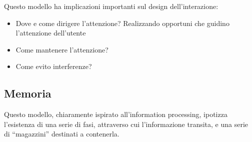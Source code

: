 \begin{center}
{
    }
\end{center}

Questo modello ha implicazioni importanti sul design dell'interazione:

\begin{itemize}
    \item Dove e come dirigere l'attenzione?
          \subitem Realizzando opportuni  che guidino l'attenzione dell'utente
    \item Come mantenere l'attenzione?
    \item Come evito interferenze?
\end{itemize}

\subsection{Memoria}

Questo modello, chiaramente ispirato all’information processing, ipotizza l’esistenza di una serie di fasi, attraverso cui l’informazione transita, e una serie di “magazzini” destinati a contenerla.


